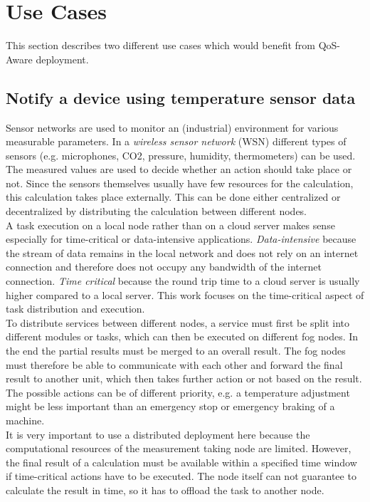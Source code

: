 \chapter{Use Cases\label{cha:use-cases}}

This section describes two different use cases which would benefit from QoS-Aware deployment.

\section{Notify a device using temperature sensor data\label{sec:sensordata}}

Sensor networks are used to monitor an (industrial) environment for various measurable parameters. In a \textit{wireless sensor network} (WSN) different types of sensors (e.g. microphones, CO2, pressure, humidity, thermometers) can be used. The measured values are used to decide whether an action should take place or not. Since the sensors themselves usually have few resources for the calculation, this calculation takes place externally. This can be done either centralized or decentralized by distributing the calculation between different nodes.\\

A task execution on a local node rather than on a cloud server makes sense especially for time-critical or data-intensive applications. \textit{Data-intensive} because the stream of data remains in the local network and does not rely on an internet connection and therefore does not occupy any bandwidth of the internet connection. \textit{Time critical} because the round trip time to a cloud server is usually higher compared to a local server. This work focuses on the time-critical aspect of task distribution and execution.\\

To distribute services between different nodes, a service must first be split into different modules or tasks, which can then be executed on different fog nodes. In the end the partial results must be merged to an overall result. The fog nodes must therefore be able to communicate with each other and forward the final result to another unit, which then takes further action or not based on the result. The possible actions can be of different priority, e.g. a temperature adjustment might be less important than an emergency stop or emergency braking of a machine.\\

It is very important to use a distributed deployment here because the computational resources of the measurement taking node are limited. However, the final result of a calculation must be available within a specified time window if time-critical actions have to be executed. The node itself can not guarantee to calculate the result in time, so it has to offload the task to another node.\\

